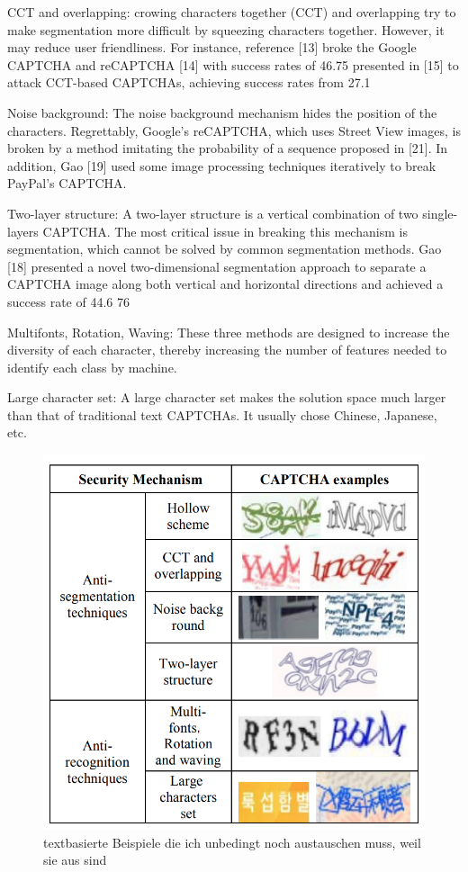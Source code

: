 CCT and overlapping: crowing characters together
(CCT) and overlapping try to make segmentation more
difficult by squeezing characters together. However, it may
reduce user friendliness. For instance, reference [13] broke the
Google CAPTCHA and reCAPTCHA [14] with success rates
of 46.75%
presented in [15] to attack CCT-based CAPTCHAs, achieving
success rates from 27.1%

Noise background: The noise background mechanism
hides the position of the characters. Regrettably, Google’s
reCAPTCHA, which uses Street View images, is broken by a
method imitating the probability of a sequence proposed in
[21]. In addition, Gao [19] used some image processing
techniques iteratively to break PayPal’s CAPTCHA.

Two-layer structure: A two-layer structure is a vertical
combination of two single-layers CAPTCHA. The most
critical issue in breaking this mechanism is segmentation,
which cannot be solved by common segmentation methods.
Gao [18] presented a novel two-dimensional segmentation
approach to separate a CAPTCHA image along both vertical
and horizontal directions and achieved a success rate of
44.6%
76

Multifonts, Rotation, Waving: These three methods are
designed to increase the diversity of each character, thereby
increasing the number of features needed to identify each class
by machine.

Large character set: A large character set makes the
solution space much larger than that of traditional text
CAPTCHAs. It usually chose Chinese, Japanese, etc. 
\cite{surveyofresearch}

\begin{figure}
    \centering
    \includegraphics{gfx/mygraphics/unbedingtaustauschen1.png}
    \caption{textbasierte Beispiele die ich unbedingt noch austauschen muss, weil sie aus \cite{surveyofresearch} sind}
    \label{fig:pr0grammcaptcha}
\end{figure}

